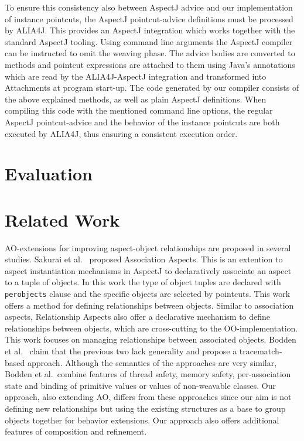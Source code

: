 \documentclass{acm_proc_article-sp}
\begin{document}
To ensure this consistency also between AspectJ advice and our implementation of instance pointcuts, the AspectJ point\-cut-advice definitions must be processed by ALIA4J.
This provides an AspectJ integration which works together with the standard AspectJ tooling.
Using command line arguments the AspectJ compiler can be instructed to omit the weaving phase.
The advice bodies are converted to methods and pointcut expressions are attached to them using Java's annotations which are read by the ALIA4J-AspectJ integration and transformed into Attachments at program start-up.
The code generated by our compiler consists of the above explained methods, as well as plain AspectJ definitions.
When compiling this code with the mentioned command line options, the regular AspectJ pointcut-advice and the behavior of the instance pointcuts are both executed by ALIA4J, thus ensuring a consistent execution order.


\section{Evaluation}








\section{Related Work}
AO-extensions for improving aspect-object relationships are proposed in several studies. Sakurai et al.~\cite{sakurai2004association} proposed Association Aspects. This is an extention to aspect instantiation mechanisms in AspectJ to declaratively associate an aspect to a tuple of objects. In this work the type of object tuples are declared with \lstinline{perobjects} clause and the specific objects are selected by pointcuts. This work offers a method for defining relationships between objects. Similar to association aspects, Relationship Aspects \cite{pearce2006relationship} also offer a declarative mechanism to define relationships between objects, which are cross-cutting to the OO-implementation. This work focuses on managing relationships between associated objects. Bodden et al.~ \cite{bodden2008relational} claim that the previous two lack generality and propose a tracematch-based approach. Although the semantics of the approaches are very similar, Bodden et al.\ combine features of thread safety, memory safety, per-association state and binding of primitive values or values of non-weavable classes. Our approach, also extending AO, differs from these approaches since our aim is not defining new relationships but using the existing structures as a base to group objects together for behavior extensions. Our approach also offers additional features of composition and refinement.
\end{document}
